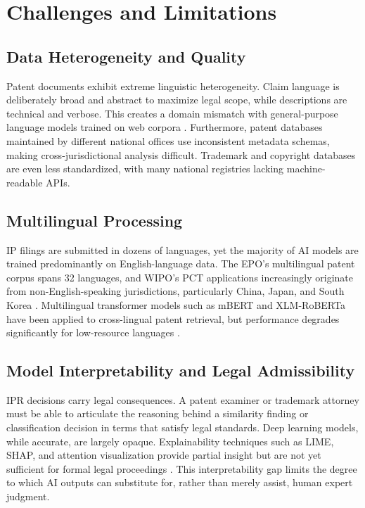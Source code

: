 \documentclass[conference]{IEEEtran}
\begin{document}
\section{Challenges and Limitations}

\subsection{Data Heterogeneity and Quality}

Patent documents exhibit extreme linguistic heterogeneity. Claim language is deliberately broad and abstract to maximize legal scope, while descriptions are technical and verbose. This creates a domain mismatch with general-purpose language models trained on web corpora \cite{ref36}. Furthermore, patent databases maintained by different national offices use inconsistent metadata schemas, making cross-jurisdictional analysis difficult. Trademark and copyright databases are even less standardized, with many national registries lacking machine-readable APIs.

\subsection{Multilingual Processing}

IP filings are submitted in dozens of languages, yet the majority of AI models are trained predominantly on English-language data. The EPO's multilingual patent corpus spans 32 languages, and WIPO's PCT applications increasingly originate from non-English-speaking jurisdictions, particularly China, Japan, and South Korea \cite{ref3}. Multilingual transformer models such as mBERT and XLM-RoBERTa have been applied to cross-lingual patent retrieval, but performance degrades significantly for low-resource languages \cite{ref37}.

\subsection{Model Interpretability and Legal Admissibility}

IPR decisions carry legal consequences. A patent examiner or trademark attorney must be able to articulate the reasoning behind a similarity finding or classification decision in terms that satisfy legal standards. Deep learning models, while accurate, are largely opaque. Explainability techniques such as LIME, SHAP, and attention visualization provide partial insight but are not yet sufficient for formal legal proceedings \cite{ref38}. This interpretability gap limits the degree to which AI outputs can substitute for, rather than merely assist, human expert judgment.
\end{document}
